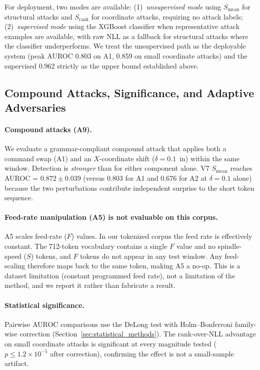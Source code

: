 For deployment, two modes are available: (1)~\emph{unsupervised mode} using $S_{\text{mean}}$ for structural attacks and $S_{\text{rank}}$ for coordinate attacks, requiring no attack labels; (2)~\emph{supervised mode} using the XGBoost classifier when representative attack examples are available, with raw NLL as a fallback for structural attacks where the classifier underperforms.
We treat the unsupervised path as the deployable system (peak AUROC 0.803 on A1, 0.859 on small coordinate attacks) and the supervised 0.962 strictly as the upper bound established above.

\subsection{Compound Attacks, Significance, and Adaptive Adversaries}
\label{sec:results_revision}

\paragraph{Compound attacks (A9).}
We evaluate a grammar-compliant compound attack that applies both a command swap (A1) and an $X$-coordinate shift ($\delta = 0.1$~in) within the same window.
Detection is \emph{stronger} than for either component alone.
V7 $S_{\text{mean}}$ reaches AUROC = $0.872 \pm 0.039$ (versus 0.803 for A1 and 0.676 for A2 at $\delta = 0.1$ alone) because the two perturbations contribute independent surprise to the short token sequence.

\paragraph{Feed-rate manipulation (A5) is not evaluable on this corpus.}
A5 scales feed-rate ($F$) values.
In our tokenized corpus the feed rate is effectively constant.
The 712-token vocabulary contains a single $F$ value and no spindle-speed ($S$) tokens, and $F$ tokens do not appear in any test window.
Any feed-scaling therefore maps back to the same token, making A5 a no-op.
This is a dataset limitation (constant programmed feed rate), not a limitation of the method, and we report it rather than fabricate a result.

\paragraph{Statistical significance.}
Pairwise AUROC comparisons use the DeLong test with Holm--Bonferroni family-wise correction (Section~\ref{sec:statistical_methods}). The rank-over-NLL advantage on small coordinate attacks is significant at every magnitude tested ($p \leq 1.2\times10^{-5}$ after correction), confirming the effect is not a small-sample artifact.

